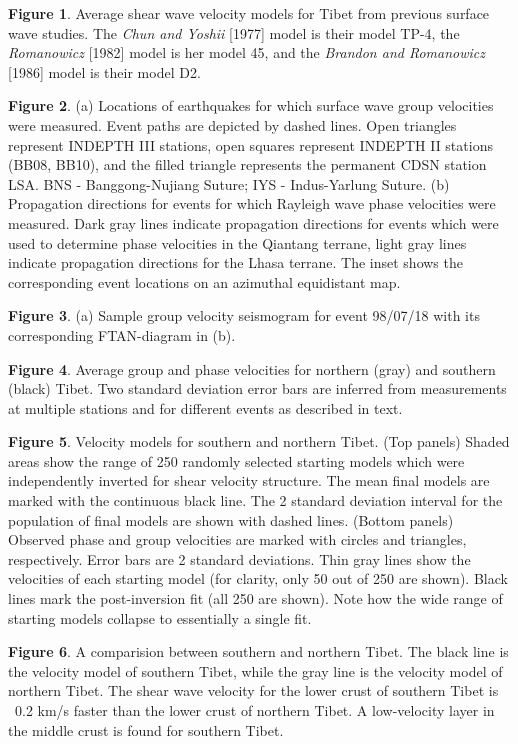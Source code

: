 \documentclass[12pt]{article}
\begin{document}
\clearpage

\noindent
{\bf Figure 1}. Average shear wave velocity models for Tibet from previous
surface wave studies.  The {\it Chun and Yoshii} [1977] model is their model
TP-4, the {\it Romanowicz} [1982] model is her model 45, and the {\it Brandon
and Romanowicz} [1986] model is their model D2.

\noindent
{\bf Figure 2}. (a) Locations of earthquakes for which surface wave group
velocities were measured.  Event paths are depicted by dashed lines.
Open triangles represent INDEPTH III stations, open squares represent
INDEPTH II stations (BB08, BB10), and the filled triangle represents
the permanent CDSN station LSA.  BNS - Banggong-Nujiang Suture; IYS -
Indus-Yarlung Suture. (b) Propagation directions for events for which
Rayleigh wave phase velocities were measured. Dark gray lines indicate propagation directions for events which were used to determine phase velocities in the Qiantang terrane, light gray lines indicate propagation directions for the Lhasa terrane. The inset shows the corresponding event locations on an azimuthal equidistant map. 

\noindent
{\bf Figure 3}. (a) Sample group velocity seismogram for event 98/07/18
with its corresponding FTAN-diagram in (b).

\noindent
{\bf Figure 4}. Average group and phase velocities for northern (gray) and southern (black) Tibet. Two standard deviation error 
bars are inferred from measurements at multiple stations and for different events as 
described in text.

\noindent
{\bf Figure 5}. Velocity models for southern and northern Tibet. (Top panels) Shaded areas show the range 
of 250 randomly selected starting models which were independently inverted for shear velocity structure. 
The mean final models are marked with the continuous black line. The 2 standard deviation interval for the population of final 
models are shown with dashed lines. (Bottom panels) Observed phase and group velocities are marked with circles and triangles, respectively. Error bars are 2 standard deviations. Thin gray lines show the 
velocities of each starting model (for clarity, only 50 out of 250 are shown). Black lines mark the 
post-inversion fit (all 250 are shown). Note how the wide range of starting models collapse to essentially 
a single fit.

\noindent
{\bf Figure 6}. A comparision between southern and northern Tibet. The black line 
is the velocity model of southern Tibet, while the gray line is the velocity model of 
northern Tibet. The shear wave velocity for the lower crust of southern Tibet is 
~0.2 km/s faster than the lower crust of northern Tibet. A low-velocity layer in 
the middle crust is found for southern Tibet. 
\end{document}
